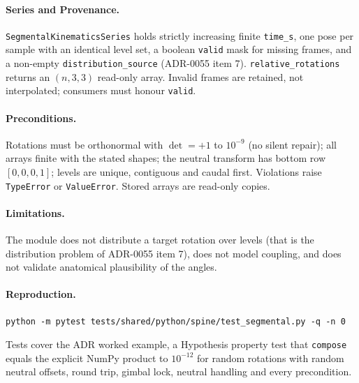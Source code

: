 \paragraph{Series and Provenance.}
\texttt{SegmentalKinematicsSeries} holds strictly increasing finite
\texttt{time\_s}, one pose per sample with an identical level set, a boolean
\texttt{valid} mask for missing frames, and a non-empty
\texttt{distribution\_source} (ADR-0055 item 7). \texttt{relative\_rotations}
returns an $(n,3,3)$ read-only array. Invalid frames are retained, not
interpolated; consumers must honour \texttt{valid}.

\paragraph{Preconditions.}
Rotations must be orthonormal with $\det=+1$ to $10^{-9}$ (no silent repair);
all arrays finite with the stated shapes; the neutral transform has bottom row
$[0,0,0,1]$; levels are unique, contiguous and caudal first. Violations raise
\texttt{TypeError} or \texttt{ValueError}. Stored arrays are read-only copies.

\paragraph{Limitations.}
The module does not distribute a target rotation over levels (that is the
distribution problem of ADR-0055 item 7), does not model coupling, and does
not validate anatomical plausibility of the angles.

\paragraph{Reproduction.}
\begin{verbatim}
python -m pytest tests/shared/python/spine/test_segmental.py -q -n 0
\end{verbatim}
Tests cover the ADR worked example, a Hypothesis property test that
\texttt{compose} equals the explicit NumPy product to $10^{-12}$ for random
rotations with random neutral offsets, round trip, gimbal lock, neutral
handling and every precondition.
